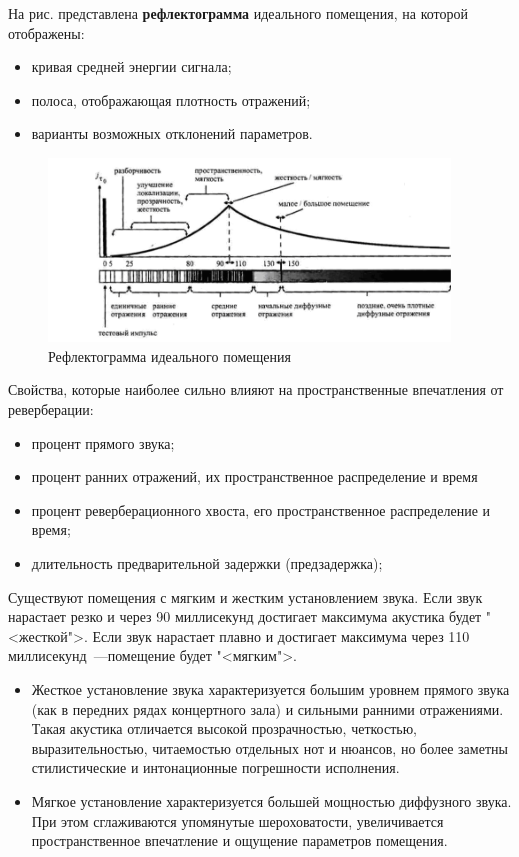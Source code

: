 \documentclass[oneside, final, 14pt]{extreport}
\begin{document}
На рис.  представлена \textbf{рефлектограмма} идеального помещения, на которой отображены:
\begin{itemize}
  \item кривая средней энергии сигнала;
  \item полоса, отображающая плотность отражений;
  \item варианты возможных отклонений параметров.
\end{itemize}
	
\begin{figure}[h!]
  \centering
  \includegraphics[width=0.95\textwidth]{pic-acoustic-02}
  \caption{Рефлектограмма идеального помещения}
  \label{pic-acoustic-02}
\end{figure}	

Свойства, которые наиболее сильно влияют на пространственные впечатления от реверберации:
\begin{itemize}
  \item процент прямого звука;
  \item процент ранних отражений, их пространственное распределение и время
  \item процент реверберационного хвоста, его пространственное распределение и время;
  \item длительность предварительной задержки (предзадержка);
\end{itemize}

Существуют помещения с мягким и жестким установлением звука. Если звук нарастает резко и через 90 миллисекунд достигает максимума акустика будет "<жесткой">. Если звук нарастает плавно и достигает максимума через 110 миллисекунд~---помещение будет "<мягким">.
\begin{itemize}
  \item Жесткое установление звука характеризуется большим уровнем прямого звука (как в передних рядах концертного зала) и сильными ранними отражениями. Такая акустика отличается высокой прозрачностью, четкостью, выразительностью, читаемостью отдельных нот и нюансов, но более заметны стилистические и интонационные погрешности исполнения.
  \item Мягкое установление характеризуется большей мощностью диффузного звука. При этом сглаживаются упомянутые шероховатости, увеличивается пространственное впечатление и ощущение параметров помещения.
\end{itemize}
	
\end{document}

